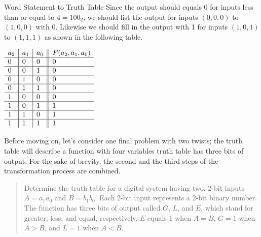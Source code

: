 \begin{process}{Word Statement to Truth Table}
Since the output should equals 0 for inputs less than or equal to $4 = 100_2$, 
we should  list the output for inputs $(0,0,0)$ to $(1,0,0)$ with 0.  Likewise we
should fill in the output with 1 for inputs $(1,0,1)$ to $(1,1,1)$ as shown in
the following table.

$\begin{array}[ht]{l|l|l||l}
a_2 & a_1 & a_0 & F(a_2, a_1, a_0)		\\ \hline
0   & 0   & 0   &	0	\\ \hline
0   & 0   & 1   &	0	\\ \hline
0   & 1   & 0   &	0	\\ \hline
0   & 1   & 1   &	0	\\ \hline
1   & 0   & 0   &	0	\\ \hline
1   & 0   & 1   &	1	\\ \hline
1   & 1   & 0   &	1	\\ \hline
1   & 1   & 1   &	1	\\ 
\end{array}$

\end{process}

Before moving on, let's consider one final problem with two
twists; the truth table will describe a function with four variables 
truth table has three bits of output.  For the sake of brevity, the second and the 
third steps of the transformation process are combined.

\begin{quote}
Determine the truth table for a digital system having two, 2-bit 
inputs $A=a_1 a_0$ and $B=b_1 b_0$. Each 2-bit input represents a 
2-bit binary number.  The function has three bits of output called
$G$, $L$, and $E$, which stand for greater, less, and equal, respectively.
$E$ equals 1 when $A=B$, $G=1$ when $A>B$, and $L=1$ when $A<B$.
\end{quote}

